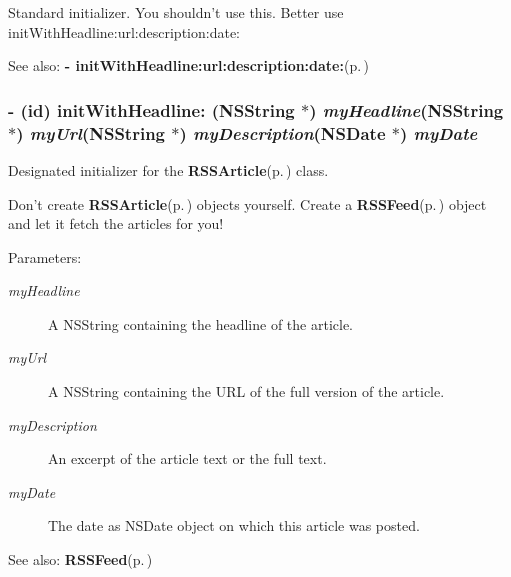 Standard initializer. You shouldn't use this. Better use init\-With\-Headline:url:description:date:

\begin{Desc}
\item[See also:]{\bf - init\-With\-Headline:url:description:date:}{\rm (p.\,\pageref{interfaceRSSArticle_72252074ba9b2edc3d4b21a9e67d5492})} \end{Desc}
\subsubsection{\setlength{\rightskip}{0pt plus 5cm}- (id) init\-With\-Headline: (NSString $\ast$) {\em my\-Headline}(NSString $\ast$) {\em my\-Url}(NSString $\ast$) {\em my\-Description}(NSDate $\ast$) {\em my\-Date}}\label{interfaceRSSArticle_72252074ba9b2edc3d4b21a9e67d5492}


Designated initializer for the {\bf RSSArticle}{\rm (p.\,\pageref{interfaceRSSArticle})} class.

Don't create {\bf RSSArticle}{\rm (p.\,\pageref{interfaceRSSArticle})} objects yourself. Create a {\bf RSSFeed}{\rm (p.\,\pageref{classRSSFeed})} object and let it fetch the articles for you!

\begin{Desc}
\item[Parameters:]
\begin{description}
\item[{\em my\-Headline}]A NSString containing the headline of the article. \item[{\em my\-Url}]A NSString containing the URL of the full version of the article. \item[{\em my\-Description}]An excerpt of the article text or the full text. \item[{\em my\-Date}]The date as NSDate object on which this article was posted. \end{description}
\end{Desc}
\begin{Desc}
\item[See also:]{\bf RSSFeed}{\rm (p.\,\pageref{classRSSFeed})} \end{Desc}
